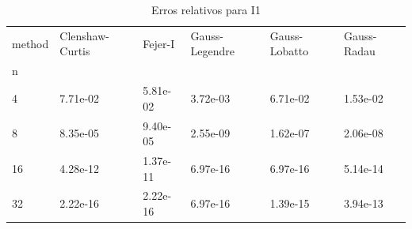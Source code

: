 \begin{table}
\centering
\caption{Erros relativos para I1}
\label{tab:errors_I1}
\begin{tabular}{llllll}
\toprule
method & Clenshaw-Curtis &   Fejer-I & Gauss-Legendre & Gauss-Lobatto & Gauss-Radau \\
n  &                 &           &                &               &             \\
\midrule
4  &        7.71e-02 &  5.81e-02 &       3.72e-03 &      6.71e-02 &    1.53e-02 \\
8  &        8.35e-05 &  9.40e-05 &       2.55e-09 &      1.62e-07 &    2.06e-08 \\
16 &        4.28e-12 &  1.37e-11 &       6.97e-16 &      6.97e-16 &    5.14e-14 \\
32 &        2.22e-16 &  2.22e-16 &       6.97e-16 &      1.39e-15 &    3.94e-13 \\
\bottomrule
\end{tabular}
\end{table}
